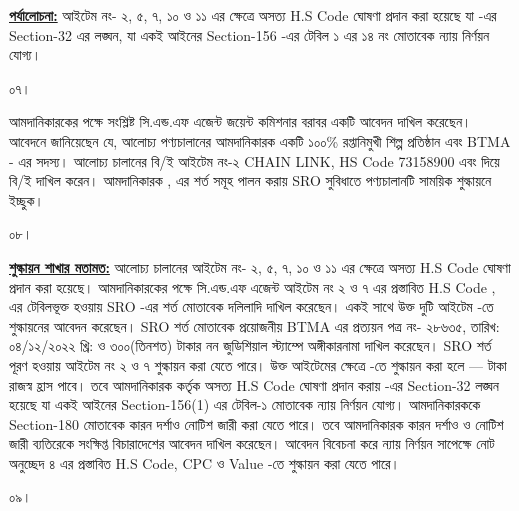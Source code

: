 \documentclass[12pt]{article}
\newcommand{\btmaltno}{প্রত্যয়ন পত্র নং- ২৮৬৩৫}
\newcommand{\btmaltnodt}{তারিখ:  ০৪/১২/২০২২ খ্রি:}
\begin{document}
\begin{minipage}[t]{0.95\linewidth}
\underline{\textbf{পর্যালোচনা:}}
আইটেম নং-  ২, ৫, ৭, ১০ ও ১১ এর ক্ষেত্রে
অসত্য H.S Code ঘোষণা প্রদান করা হয়েছে যা
{\tca}
-এর Section-32 এর লঙ্ঘন, যা একই আইনের
Section-156 -এর টেবিল ১ এর ১৪ নং মোতাবেক ন্যায় নির্ণয়ন যোগ্য।
\\
\end{minipage}
\begin{minipage}[t]{0.05\linewidth}
০৭।
\end{minipage}
\begin{minipage}[t]{0.95\linewidth}
আমদানিকারকের পক্ষে সংশ্লিষ্ট সি.এন্ড.এফ এজেন্ট
জয়েন্ট কমিশনার বরাবর একটি আবেদন দাখিল করেছেন।
আবেদনে জানিয়েছেন যে,
আলোচ্য পণ্যচালানের
আমদানিকারক একটি ১০০\% রপ্তানিমুখী শিল্প প্রতিষ্ঠান এবং
BTMA - এর সদস্য। আলোচ্য চালানের বি/ই আইটেম নং-২
CHAIN LINK, HS Code 73158900 এবং {\cpcost}
দিয়ে বি/ই দাখিল করেন। আমদানিকারক {\srootz}, {\srootzd}
এর শর্ত সমূহ পালন করায় SRO সুবিধাতে পণ্যচালানটি
সাময়িক শুল্কায়নে ইচ্ছুক।
\\
\end{minipage}
\begin{minipage}[t]{0.05\linewidth}
০৮।
\end{minipage}
\begin{minipage}[t]{0.95\linewidth}
\underline{\textbf{শুল্কায়ন শাখার মতামত:}}
আলোচ্য চালানের আইটেম নং-
২, ৫, ৭, ১০ ও ১১
এর ক্ষেত্রে অসত্য H.S Code ঘোষণা প্রদান করা হয়েছে।
আমদানিকারকের পক্ষে সি.এন্ড.এফ এজেন্ট আইটেম নং
২ ও ৭ এর প্রস্তাবিত H.S Code
{\srootz}, {\srootzd}
এর টেবিলভূক্ত হওয়ায় SRO -এর শর্ত মোতাবেক দলিলাদি
দাখিল করেছেন। একই সাথে উক্ত দুটি আইটেম
{\cpcofs} -তে শুল্কায়নের আবেদন করেছেন।
SRO শর্ত মোতাবেক প্রয়োজনীয় BTMA এর
{\btmaltno}, {\btmaltnodt}
ও ৩০০(তিনশত) টাকার নন জুডিশিয়াল স্ট্যাম্পে
অঙ্গীকারনামা দাখিল করেছেন। SRO শর্ত পূরণ হওয়ায়
আইটেম নং ২ ও ৭
{\cpcofs}
শুল্কায়ন করা যেতে পারে।
উক্ত আইটেমের ক্ষেত্রে
{\cpcofs} -তে শুল্কায়ন করা হলে
--- টাকা রাজস্ব হ্রাস পাবে।
তবে আমদানিকারক কর্তৃক অসত্য
H.S Code ঘোষণা প্রদান করায় {\tca} -এর Section-32
লঙ্ঘন হয়েছে যা একই আইনের Section-156(1) এর টেবিল-১
মোতাবেক ন্যায় নির্ণয়ন যোগ্য।
আমদানিকারককে Section-180 মোতাবেক কারন দর্শাও
নোটিশ জারী করা যেতে পারে।
তবে আমদানিকারক কারন দর্শাও
ও নোটিশ জারী ব্যতিরেকে সংক্ষিপ্ত বিচারাদেশের
আবেদন দাখিল করেছেন। আবেদন বিবেচনা করে ন্যায়
নির্ণয়ন সাপেক্ষে নোট অনুচ্ছেদ ৪ এর প্রস্তাবিত
H.S Code, CPC ও Value -তে শুল্কায়ন করা যেতে পারে।
\\
\end{minipage}
\begin{minipage}[t]{0.05\linewidth}
০৯।
\end{minipage}
\end{document}
